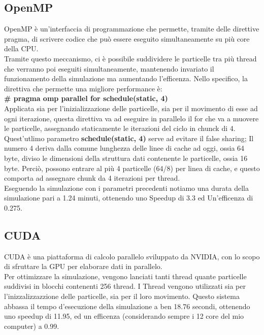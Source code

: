 \documentclass{article}
\begin{document}
\subsection{OpenMP}
OpenMP è un'interfaccia di programmazione che permette, tramite delle direttive pragma, di scrivere codice che può essere eseguito simultaneamente su più core della CPU.\\
Tramite questo meccanismo, ci è possibile suddividere le particelle tra più thread che verranno poi eseguiti simultaneamente, mantenendo invariato il funzionamento della simulazione ma aumentando l'efficenza.
Nello specifico, la direttiva che permette una migliore performance è:\\
\textbf{\#   pragma omp parallel for schedule(static, 4)}\\
Applicata sia per l'inizializzazione delle particelle, sia per il movimento di esse ad ogni iterazione, questa direttiva va ad eseguire in parallelo il for che va a muovere le particelle, assegnando staticamente le iterazioni del ciclo in chunck di 4.
Quest'utlimo parametro \textbf{schedule(static, 4)} serve ad evitare il false sharing; Il numero 4 deriva dalla comune lunghezza delle linee di cache ad oggi, ossia 64 byte, diviso le dimensioni della struttura dati contenente le particelle, ossia 16 byte. Perciò, possono entrare al più 4 particelle (64/8) per linea di cache, e questo comporta ad assegnare chunk da 4 iterazioni per thread.\\
Eseguendo la simulazione con i parametri precedenti notiamo una durata della simulazione pari a 1.24 minuti, ottenendo uno Speedup di 3.3 ed Un'efficenza di 0.275.
\subsection{CUDA}
CUDA è una piattaforma di calcolo parallelo sviluppato da NVIDIA, con lo scopo di sfruttare la GPU per elaborare dati in parallelo.\\
Per ottimizzare la simulazione, vengono lanciati tanti thread quante particelle suddivisi in blocchi contenenti 256 thread. I Thread vengono utilizzati sia per l'inizzalizzazzione delle particelle, sia per il loro movimento. Questo sistema abbassa il tempo d'esecuzione della simulazione a ben 18.76 secondi, ottenendo uno speedup di 11.95, ed un efficenza (considerando sempre i 12 core del mio computer) a 0.99.
\end{document}
